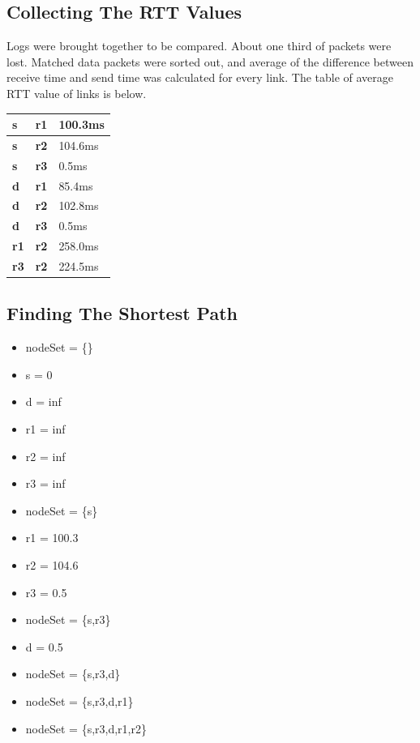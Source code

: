 \documentclass[conference]{IEEEtran}
\begin{document}
\subsection{Collecting The RTT Values}

Logs were brought together to be compared. About one third of packets were lost. Matched data packets were sorted out, and average of the difference between receive time and send time was calculated for every link. The table of average RTT value of links is below.
\begin{table}[h]
\centering
\begin{tabular}{|l|l|l|}
\hline
\textbf{s}  & \textbf{r1} & 100.3ms \\ \hline
\textbf{s}  & \textbf{r2} & 104.6ms \\ \hline
\textbf{s}  & \textbf{r3} & 0.5ms   \\ \hline
\textbf{d}  & \textbf{r1} & 85.4ms  \\ \hline
\textbf{d}  & \textbf{r2} & 102.8ms \\ \hline
\textbf{d}  & \textbf{r3} & 0.5ms   \\ \hline
\textbf{r1} & \textbf{r2} & 258.0ms \\ \hline
\textbf{r3} & \textbf{r2} & 224.5ms \\ \hline
\end{tabular}
\end{table}

\subsection{Finding The Shortest Path}

\begin{itemize}
    \item nodeSet = \{\}
    \item s = 0
    \item d = inf
    \item r1 = inf
    \item r2 = inf
    \item r3 = inf
    \item nodeSet = \{s\}
    \item r1 = 100.3
    \item r2 = 104.6
    \item r3 = 0.5
    \item nodeSet = \{s,r3\}
    \item d = 0.5
    \item nodeSet = \{s,r3,d\}
    \item nodeSet = \{s,r3,d,r1\}
    \item nodeSet = \{s,r3,d,r1,r2\}
\end{itemize}
\end{document}
